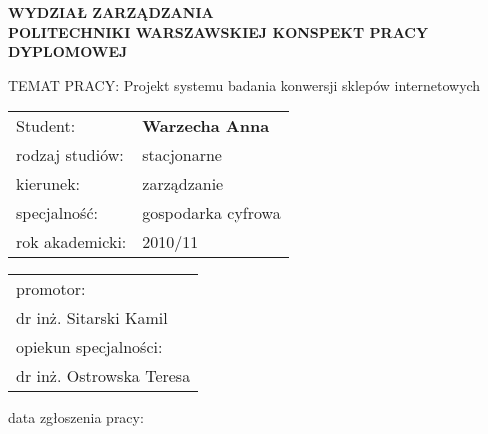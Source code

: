 
\begin{center}
\fontsize{15.2pt}{26pt}\sffamily\bfseries
WYDZIAŁ ZARZĄDZANIA \\
\fontsize{10.8pt}{17pt}\sffamily\bfseries
POLITECHNIKI WARSZAWSKIEJ
\vskip 1.4in
\fontsize{15pt}{2}\sffamily\bfseries
KONSPEKT PRACY DYPLOMOWEJ
\end{center}

\vskip0.4in

\begin{flushleft}
\fontsize{12pt}{16}\sffamily
TEMAT PRACY: {Projekt systemu badania konwersji sklepów internetowych}
\vskip 1.1in
\hspace{-8pt}\begin{tabular}{ll}
  Student:&\hspace{17pt} \bfseries Warzecha Anna \\[40pt]
  rodzaj studiów:&\hspace{17pt} stacjonarne \\
  kierunek:&\hspace{17pt} zarządzanie \\
  specjalność:&\hspace{17pt} gospodarka cyfrowa \\
  rok akademicki:&\hspace{17pt} 2010/11 \\
\end{tabular}
\end{flushleft}
\vskip 0.1in
\begin{center}
\fontsize{12pt}{27}\sffamily
\hspace{165pt}\begin{tabular}{l}
  promotor: \\
  {dr inż. Sitarski Kamil}\\
  opiekun specjalności:\\
  {dr inż. Ostrowska Teresa}\\
\end{tabular}
\end{center}
\begin{flushleft}
\fontsize{12pt}{14}\sffamily
data zgłoszenia pracy:\\
\end{flushleft}
\newpage

\tableofcontents
\newpage
